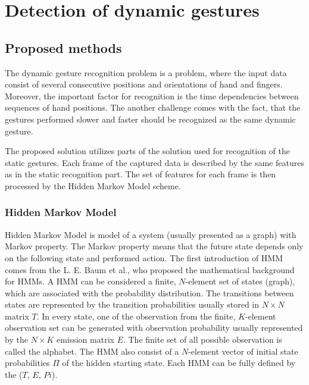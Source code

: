 \chapter{Detection of dynamic gestures}

\section{Proposed methods}

The dynamic gesture recognition problem is a problem, where the input data consist of several consecutive positions and orientations of hand and fingers. 
Moreover, the important factor for recognition is the time dependencies between sequences of hand positions.
The another challenge comes with the fact, that the gestures performed slower and faster should be recognized as the same dynamic gesture.

The proposed solution utilizes parts of the solution used for recognition of the static gestures.
Each frame of the captured data is described by the same features as in the static recognition part.
The set of features for each frame is then processed by the Hidden Markov Model scheme. 

\subsection{Hidden Markov Model}

Hidden Markov Model is model of a system (usually presented as a graph) with Markov property.
The Markov property means that the future state depends only on the following state and performed action.
The first introduction of HMM comes from the L. E. Baum et al.\cite{hmmfirst}, who proposed the mathematical background for HMMs.
A HMM can be considered a finite, $N$-element set of states (graph), which are associated with the probability distribution.
The transitions between states are represented by the transition probabilities usually stored in $N \times N$ matrix $T$.
In every state, one of the observation from the finite, $K$-element observation set can be generated with observation probability usually represented by the $N \times K$ emission matrix $E$.
The finite set of all possible observation is called the alphabet.
The HMM also consist of a $N$-element vector of initial state probabilities $\Pi$ of the hidden starting state.
Each HMM can be fully defined by the ($T$, $E$, $Pi$).

